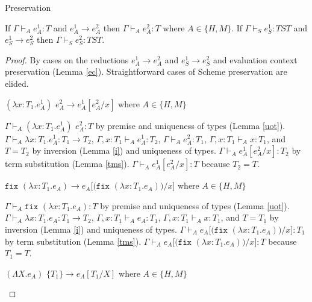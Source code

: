 \begin{theorem}{Preservation}

\label{thmpre}

If $\Gamma\vdash_{A}e_{A}^{1}:T$ and $e_{A}^{1}\rightarrow e_{A}^{2}$ then $\Gamma\vdash_{A}e_{A}^{2}:T$ where $A\in\lbrace H,M\rbrace$.  If $\Gamma\vdash_{S}e_{S}^{1}:TST$ and $e_{S}^{1}\rightarrow e_{S}^{2}$ then $\Gamma\vdash_{S}e_{S}^{2}:TST$.

\begin{proof}

By cases on the reductions $e_{A}^{1}\rightarrow e_{A}^{2}$ and $e_{S}^{1}\rightarrow e_{S}^{2}$ and evaluation context preservation (Lemma \ref{ec}).  Straightforward cases of Scheme preservation are elided.


\begin{case}
$(\lambda x:T_{1}.e_{A}^{1})$ $e_{A}^{2}\rightarrow e_{A}^{1}[e_{A}^{2}/x]$ where $A\in\lbrace H,M\rbrace$

$\Gamma\vdash_{A}(\lambda x:T_{1}.e_{A}^{1})$ $e_{A}^{2}:T$ by premise and uniqueness of types (Lemma \ref{uot}).  $\Gamma\vdash_{A}\lambda x:T_{1}.e_{A}^{1}:T_{1}\rightarrow T_{2}$, $\Gamma,x:T_{1}\vdash_{A}e_{A}^{1}:T_{2}$, $\Gamma\vdash_{A}e_{A}^{2}:T_{1}$, $\Gamma,x:T_{1}\vdash_{A}x:T_{1}$, and $T=T_{2}$ by inversion (Lemma \ref{i}) and uniqueness of types.  $\Gamma\vdash_{A}e_{A}^{1}[e_{A}^{2}/x]:T_{2}$ by term substitution (Lemma \ref{tms}).  $\Gamma\vdash_{A}e_{A}^{1}[e_{A}^{2}/x]:T$ because $T_{2}=T$.
\end{case}


\begin{case}
$\mathtt{fix}$ $(\lambda x:T_{1}.e_{A})\rightarrow e_{A}[(\mathtt{fix}$ $(\lambda x:T_{1}.e_{A}))/x]$ where $A\in\lbrace H,M\rbrace$

$\Gamma\vdash_{A}\mathtt{fix}$ $(\lambda x:T_{1}.e_{A}):T$ by premise and uniqueness of types (Lemma \ref{uot}).  $\Gamma\vdash_{A}\lambda x:T_{1}.e_{A}:T_{1}\rightarrow T_{2}$, $\Gamma,x:T_{1}\vdash_{A}e_{A}:T_{1}$, $\Gamma,x:T_{1}\vdash_{A}x:T_{1}$, and $T=T_{1}$ by inversion (Lemma \ref{i}) and uniqueness of types.  $\Gamma\vdash_{A}e_{A}[(\mathtt{fix}$ $(\lambda x:T_{1}.e_{A}))/x]:T_{1}$ by term substitution (Lemma \ref{tms}).  $\Gamma\vdash_{A}e_{A}[(\mathtt{fix}$ $(\lambda x:T_{1}.e_{A}))/x]:T$ because $T_{1}=T$.
\end{case}


\begin{case}
$(\Lambda X.e_{A})$ $\lbrace T_{1}\rbrace\rightarrow e_{A}[T_{1}/X]$ where $A\in\lbrace H,M\rbrace$


\end{case}
\end{proof}
\end{theorem}
